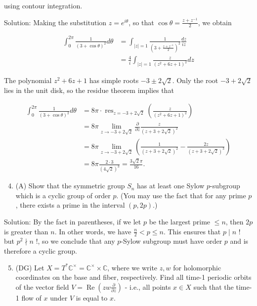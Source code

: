 \documentclass[10pt]{article}
\begin{document}
using contour integration.

Solution: Making the substitution $z=e^{i \theta}$, so that $\cos \theta=\frac{z+z^{-1}}{2}$, we obtain

$$
\begin{aligned}
\int_{0}^{2 \pi} \frac{1}{(3+\cos \theta)^{2}} d \theta & =\int_{|z|=1} \frac{1}{\left(3+\frac{z+z^{-1}}{2}\right)^{2}} \frac{d z}{i z} \\
& =\frac{4}{i} \int_{|z|=1} \frac{z}{\left(z^{2}+6 z+1\right)^{2}} d z
\end{aligned}
$$

The polynomial $z^{2}+6 z+1$ has simple roots $-3 \pm 2 \sqrt{2}$. Only the root $-3+2 \sqrt{2}$ lies in the unit disk, so the residue theorem implies that

$$
\begin{aligned}
\int_{0}^{2 \pi} \frac{1}{(3+\cos \theta)^{2}} d \theta & =8 \pi \cdot \operatorname{res}_{z=-3+2 \sqrt{2}}\left(\frac{z}{\left(z^{2}+6 z+1\right)^{2}}\right) \\
& =8 \pi \lim _{z \rightarrow-3+2 \sqrt{2}} \frac{\partial}{\partial z} \frac{z}{(z+3+2 \sqrt{2})^{2}} \\
& =8 \pi \lim _{z \rightarrow-3+2 \sqrt{2}}\left(\frac{1}{(z+3+2 \sqrt{2})^{2}}-\frac{2 z}{(z+3+2 \sqrt{2})^{3}}\right) \\
& =8 \pi \frac{2 \cdot 3}{(4 \sqrt{2})^{3}}=\frac{3 \sqrt{2} \pi}{16} .
\end{aligned}
$$

\begin{enumerate}
  \setcounter{enumi}{3}
  \item (A) Show that the symmetric group $S_{n}$ has at least one Sylow $p$-subgroup which is a cyclic group of order $p$. (You may use the fact that for any prime $p$, there exists a prime in the interval $(p, 2 p)$.)
\end{enumerate}

Solution: By the fact in parentheses, if we let $p$ be the largest prime $\leq n$, then $2 p$ is greater than $n$. In other words, we have $\frac{n}{2}<p \leq n$. This ensures that $p \mid n$ ! but $p^{2} \nmid n$ !, so we conclude that any $p$-Sylow subgroup must have order $p$ and is therefore a cyclic group.

\begin{enumerate}
  \setcounter{enumi}{4}
  \item (DG) Let $X=T^{*} \mathbb{C}^{\times}=\mathbb{C}^{\times} \times \mathbb{C}$, where we write $z, w$ for holomorphic coordinates on the base and fiber, respectively. Find all time-1 periodic orbits of the vector field $V=\operatorname{Re}\left(z w \frac{\partial}{\partial z}\right)$ - i.e., all points $x \in X$ such that the time-1 flow of $x$ under $V$ is equal to $x$.
\end{enumerate}
\end{document}
